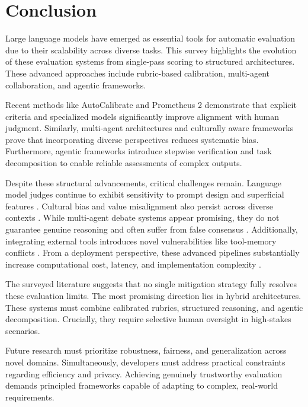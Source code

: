 \section{Conclusion}


Large language models have emerged as essential tools for automatic evaluation due to their scalability across diverse tasks. This survey highlights the evolution of these evaluation systems from single-pass scoring to structured architectures. These advanced approaches include rubric-based calibration, multi-agent collaboration, and agentic frameworks.

Recent methods like AutoCalibrate \cite{autocalibrate} and Prometheus 2 \cite{prometheus2} demonstrate that explicit criteria and specialized models significantly improve alignment with human judgment. Similarly, multi-agent architectures \cite{prd} and culturally aware frameworks \cite{macd} prove that incorporating diverse perspectives reduces systematic bias. Furthermore, agentic frameworks \cite{agent_judge, auto_eval_judge} introduce stepwise verification and task decomposition to enable reliable assessments of complex outputs.

Despite these structural advancements, critical challenges remain. Language model judges continue to exhibit sensitivity to prompt design and superficial features \cite{comm_systems}. Cultural bias and value misalignment also persist across diverse contexts \cite{macd}. While multi-agent debate systems appear promising, they do not guarantee genuine reasoning and often suffer from false consensus \cite{debate_limit}. Additionally, integrating external tools introduces novel vulnerabilities like tool-memory conflicts \cite{tool_conflict}. From a deployment perspective, these advanced pipelines substantially increase computational cost, latency, and implementation complexity \cite{agent_survey}.

The surveyed literature suggests that no single mitigation strategy fully resolves these evaluation limits. The most promising direction lies in hybrid architectures. These systems must combine calibrated rubrics, structured reasoning, and agentic decomposition. Crucially, they require selective human oversight in high-stakes scenarios.

Future research must prioritize robustness, fairness, and generalization across novel domains. Simultaneously, developers must address practical constraints regarding efficiency and privacy. Achieving genuinely trustworthy evaluation demands principled frameworks capable of adapting to complex, real-world requirements.